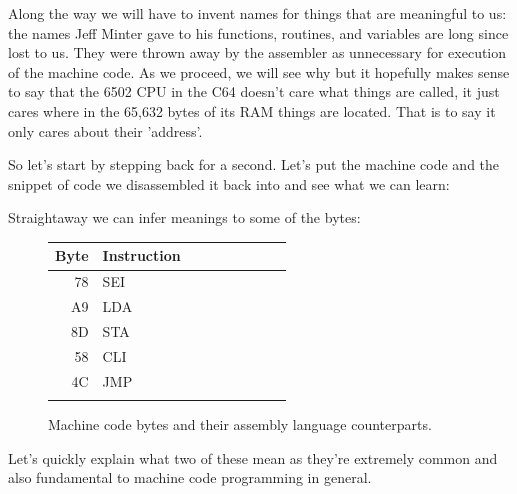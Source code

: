 Along the way we will have to invent names for things that are meaningful to us: the names Jeff Minter gave to his
functions, routines, and variables are long since lost to us. They were thrown away by the assembler as unnecessary
for execution of the machine code. As we proceed, we will see why but it hopefully makes sense to say that the
6502 CPU in the C64 doesn't care what things are called, it just cares where in the 65,632 bytes of its RAM things
are located. That is to say it only cares about their 'address'.

So let's start by stepping back for a second. Let's put the machine code and the snippet of code we disassembled it
back into and see what we can learn:

\begin{minipage}[b]{0.45\linewidth}
\centering

\end{minipage}
\hspace{0.5cm}
\begin{minipage}[b]{0.45\linewidth}
\centering

\end{minipage}


Straightaway we can infer meanings to some of the bytes:

\begin{figure}[H]
  {
    \setlength{\tabcolsep}{3.0pt}
    \setlength\cmidrulewidth{\heavyrulewidth} %
    \begin{adjustbox}{width=3cm,center}

      \begin{tabular}{rllllllll}
        \toprule
        Byte & Instruction &\\
        \midrule
78 & SEI & \\
A9 & LDA & \\
8D & STA & \\
58 & CLI & \\
4C & JMP & \\
        \addlinespace
        \bottomrule
      \end{tabular}
    \end{adjustbox}
  }\caption{Machine code bytes and their assembly language counterparts.}
\end{figure}

Let's quickly explain what two of these mean as they're extremely common and also fundamental to
machine code programming in general.

